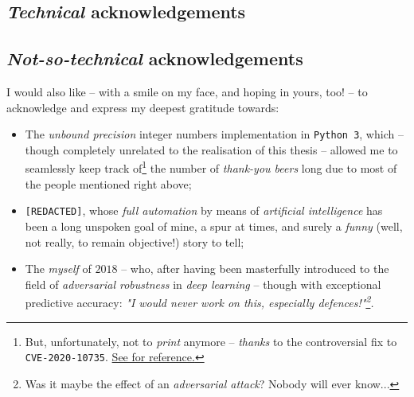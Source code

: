 

\subsection*{\textit{Technical} acknowledgements}

\subsection*{\textit{Not-so-technical} acknowledgements}

I would also like -- with a smile on my face, and hoping in yours, too! -- to acknowledge and express my deepest gratitude towards:

\begin{itemize}
    \item The \textit{unbound precision} integer numbers implementation in \texttt{Python 3}, which -- though completely unrelated to the realisation of this thesis -- allowed me to seamlessly keep track of\footnote{But, unfortunately, not to \textit{print} anymore -- \textit{thanks} to the controversial fix to \texttt{CVE-2020-10735}. \href{https://github.com/python/cpython/issues/95778}{See for reference.}} the number of \textit{thank-you beers} long due to most of the people mentioned right above;

    \item \texttt{[REDACTED]}, whose \textit{full automation} by means of \textit{artificial intelligence} has been a long unspoken goal of mine, a spur at times, and surely a \textit{funny} (well, not really, to remain objective!) story to tell;

    \item The \textit{myself} of $2018$ -- who, after having been masterfully introduced to the field of \textit{adversarial robustness} in \textit{deep learning} -- though with exceptional predictive accuracy: \textit{"I would never work on this, especially defences!"\footnote{Was it maybe the effect of an \textit{adversarial attack}? Nobody will ever know...}.}
\end{itemize}
